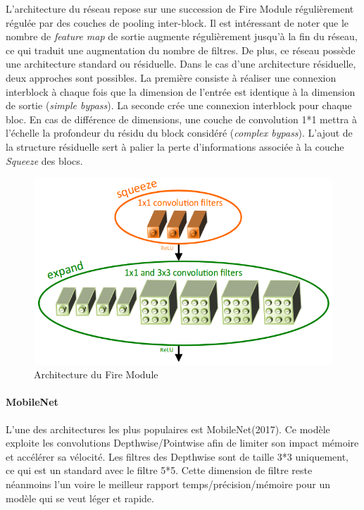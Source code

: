 \noindent L'architecture du réseau repose sur une succession de Fire Module régulièrement régulée par des couches de pooling inter-block. Il est intéressant de noter que le nombre de \textit{feature map} de sortie augmente régulièrement jusqu'à la fin du réseau, ce qui traduit une augmentation du nombre de filtres. De plus, ce réseau possède une architecture standard ou résiduelle. Dans le cas d'une architecture résiduelle, deux approches sont possibles. La première consiste à réaliser une connexion interblock à chaque fois que la dimension de l'entrée est identique à la dimension de sortie (\textit{simple bypass}). La seconde crée une connexion interblock pour chaque bloc. En cas de différence de dimensions, une couche de convolution 1*1 mettra à l'échelle la profondeur du résidu du block considéré (\textit{complex bypass}). L'ajout de la structure résiduelle sert à palier la perte d'informations associée à la couche \textit{Squeeze} des blocs.

\begin{figure}
    \centering
    \includegraphics[scale=0.4]{./tex/convolution-network/classifier/squeezbloc.png}
    \caption{Architecture du Fire Module}
    \label{firemodule}
\end{figure}

\paragraph{MobileNet}

L'une des architectures les plus populaires est MobileNet\cite{mobilenet}(2017). Ce modèle exploite les convolutions Depthwise/Pointwise afin de limiter son impact mémoire et accélérer sa vélocité. Les filtres des Depthwise sont de taille 3*3 uniquement, ce qui est un standard avec le filtre 5*5. Cette dimension de filtre reste néanmoins l'un voire le meilleur rapport temps/précision/mémoire pour un modèle qui se veut léger et rapide. \\

